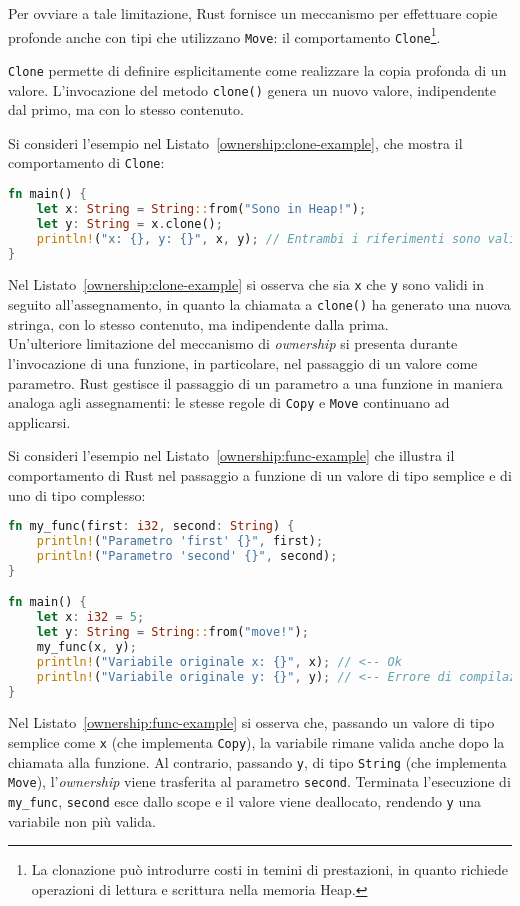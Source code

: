 Per ovviare a tale limitazione, Rust fornisce un meccanismo per effettuare copie profonde anche con tipi che utilizzano \texttt{Move}: il comportamento \texttt{Clone}\footnote{La clonazione può introdurre costi in temini di prestazioni, in quanto richiede operazioni di lettura e scrittura nella memoria Heap.}.

\texttt{Clone} permette di definire esplicitamente come realizzare la copia profonda di un valore. L'invocazione del metodo \texttt{clone()} genera un nuovo valore, indipendente dal primo, ma con lo stesso contenuto.

Si consideri l'esempio nel Listato~\ref{ownership:clone-example}, che mostra il comportamento di \texttt{Clone}:\hfill
\begin{lstlisting}[language=Rust, caption={Comportamento di Clone}, label={ownership:clone-example}]
fn main() {
    let x: String = String::from("Sono in Heap!");
    let y: String = x.clone();
    println!("x: {}, y: {}", x, y); // Entrambi i riferimenti sono validi
}
\end{lstlisting}
Nel Listato~\ref{ownership:clone-example} si osserva che sia \texttt{x} che \texttt{y} sono validi in seguito all'assegnamento, in quanto la chiamata a \texttt{clone()} ha generato una nuova stringa, con lo stesso contenuto, ma indipendente dalla prima. \hfill
\vspace{10pt}\\
\noindent Un'ulteriore limitazione del meccanismo di \textit{ownership} si presenta durante l'invocazione di una funzione, in particolare, nel passaggio di un valore come parametro.
Rust gestisce il passaggio di un parametro a una funzione in maniera analoga agli assegnamenti: le stesse regole di \texttt{Copy} e \texttt{Move} continuano ad applicarsi.

Si consideri l'esempio nel Listato~\ref{ownership:func-example} che illustra il comportamento di Rust nel passaggio a funzione di un valore di tipo semplice e di uno di tipo complesso:
\begin{lstlisting}[language=Rust, caption={Trasferimento di ownership nelle chiamate a funzione}, label={ownership:func-example}]
fn my_func(first: i32, second: String) {
    println!("Parametro 'first' {}", first);
    println!("Parametro 'second' {}", second);
}

fn main() {
    let x: i32 = 5;
    let y: String = String::from("move!");
    my_func(x, y);
    println!("Variabile originale x: {}", x); // <-- Ok
    println!("Variabile originale y: {}", y); // <-- Errore di compilazione: ownership trasferita
}
\end{lstlisting}
Nel Listato~\ref{ownership:func-example} si osserva che, passando un valore di tipo semplice come \texttt{x} (che implementa \texttt{Copy}), la variabile rimane valida anche dopo la chiamata alla funzione. Al contrario, passando \texttt{y}, di tipo \texttt{String} (che implementa \texttt{Move}), l'\textit{ownership} viene trasferita al parametro \texttt{second}. Terminata l'esecuzione di \texttt{my\_func}, \texttt{second} esce dallo scope e il valore viene deallocato, rendendo \texttt{y} una variabile non più valida.

